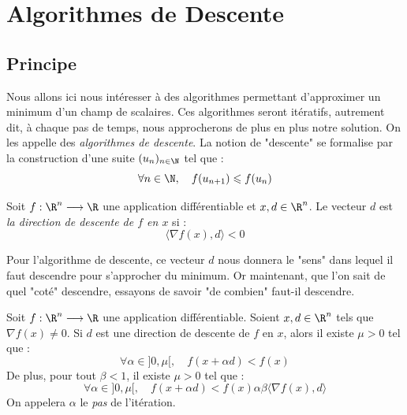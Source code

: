 \section{Algorithmes de Descente}

\subsection{Principe}

Nous allons ici nous intéresser à des algorithmes permettant d'approximer un minimum d'un champ de scalaires. 
Ces algorithmes seront itératifs, autrement dit, à chaque pas de temps, nous approcherons de plus en plus 
notre solution. On les appelle des \emph{algorithmes de descente}. 
La notion de "descente" se formalise par la construction d'une suite $(u_n)_{n \in \N}$ tel que : 
    $$ \forall n \in \N, \quad f(u_{n+1}) \leqslant f(u_n) $$ 

\begin{definition}
    Soit $f : \R^n \longrightarrow \R$ une application différentiable et $x,d \in \R^n$. 
    Le vecteur $d$ est \emph{la direction de descente de $f$ en $x$} si : 
        \begin{equation}\label{eq:direction-descente}
            \langle \nabla f(x), d \rangle < 0
        \end{equation}
\end{definition}

Pour l'algorithme de descente, ce vecteur $d$ nous donnera le "sens" dans lequel il faut descendre 
pour s'approcher du minimum. Or maintenant, que l'on sait de quel "coté" descendre, essayons de 
savoir "de combien" faut-il descendre. 

\begin{theorem}
    Soit $f : \R^n \longrightarrow \R$ une application différentiable. Soient $x,d \in \R^n$ tels que 
    $ \nabla f(x) \not = 0$. Si $d$ est une direction de descente de $f$ en $x$, alors il existe $ \mu > 0$ 
    tel que : 
        \begin{equation}
            \boxed{\forall \alpha \in ]0, \mu[, \quad f(x + \alpha d) < f(x)}
        \end{equation} 
    De plus, pour tout $ \beta < 1$, il existe $ \mu > 0$ tel que : 
        \begin{equation}
            \boxed{\forall \alpha \in ]0, \mu[, \quad f(x + \alpha d) < f(x) \alpha \beta \langle \nabla f(x), d \rangle}
        \end{equation} 
    On appelera $ \alpha$ le \emph{pas} de l'itération. 
\end{theorem}

